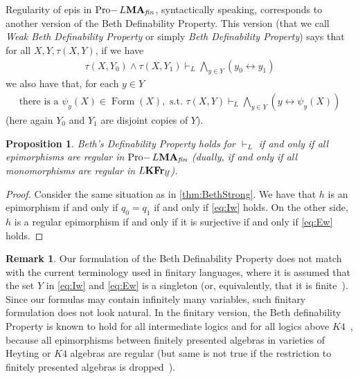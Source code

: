 \documentclass{article}
\newtheorem{prop}{Proposition}
\theoremstyle{definition}
\newtheorem{rem}{Remark}
\DeclareMathOperator{\Formulas}{Form}
\DeclareMathOperator{\Pro}{Pro-}
\newcommand{\KFr}{\textup{\textbf{KFr}}}
\newcommand{\MA}{\textup{\textbf{MA}}}
\newcommand{\fin}{\textit{fin}}
\newcommand{\lf}{\textit{lf}}
\begin{document}
Regularity of epis in $\Pro L\MA_\fin$, 
syntactically speaking, corresponds to another version of the Beth Definability Property. This version 
(that we call \emph{Weak Beth Definability Property} or simply \emph{Beth Definability Property}) says that 
for all $X,Y, \tau(X,Y)$, if we have 
\begin{align}\label{eq:Iw}
\tau(X,Y_0) \wedge \tau(X,Y_1) \vdash_L 
\bigwedge_{y\in Y} (y_0\leftrightarrow y_1)
\tag{wI}
\end{align}
we also have that, for each $y\in Y$
\begin{align}\label{eq:Ew}
\text{there is a }  \psi_y(X) \in \Formulas(X), \text{ s.t.\ } \tau(X,Y)\vdash_L  \bigwedge_{y\in Y} (y\leftrightarrow \psi_y(X))\tag{wE}
\end{align}
(here again $Y_0$ and $Y_1$ are disjoint copies of $Y$).
\begin{prop}\label{prop:wB}
Beth's Definability Property holds for $\vdash_L$ if and only if all epimorphisms are regular in $\Pro L\MA_\fin$
(dually, if and only if all monomorphisms are regular in $L\KFr_\lf$).
\end{prop}
\begin{proof}
Consider the same situation as in \cref{thm:BethStrong}.
We have that $h$ is an epimorphism if and only if $q_0 = q_1$ if and only if \cref{eq:Iw} holds. On the other side, $h$ is a regular epimorphism if and only if it is surjective if and only if \cref{eq:Ew} holds.  
\end{proof}

\begin{rem}
Our formulation of the Beth Definability Property does not match with the current terminology used in  finitary languages, where it is assumed that the set $Y$ in \eqref{eq:Iw} and \eqref{eq:Ew} is a singleton (or, equivalently, that it is finite~\cite{Ghi-Zaw}). Since our formulas may contain infinitely many variables, such finitary formulation does not look natural. In the finitary version, the Beth definability Property is known to hold for all intermediate logics and for all logics above $K4$~\cite{Mak92}, because all epimorphisms between finitely presented algebras in varieties of Heyting or $K4$ algebras are regular (but same is not true if the restriction to finitely presented algebras is dropped~\cite{Mor17,Mor20}). 
\end{rem}
\end{document}
